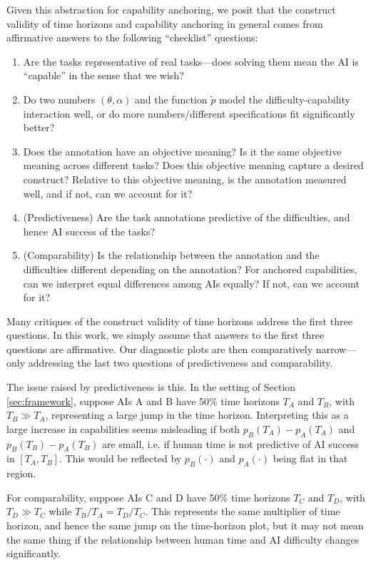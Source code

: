 \documentclass{article}
\theoremstyle{definition}
\begin{document}
Given this abstraction for capability anchoring, we posit that the construct validity of time horizons and capability anchoring in general comes from affirmative answers to the following ``checklist'' questions: 
\begin{enumerate}
    \item Are the tasks representative of real tasks---does solving them mean the AI is ``capable'' in the sense that we wish?
    \item Do two numbers $(\theta, \alpha)$ and the function $\tilde p$ model the difficulty-capability interaction well, or do more numbers/different specifications fit significantly better? 
    \item Does the annotation have an objective meaning? Is it the same objective meaning across different tasks? Does this objective meaning capture a desired construct? Relative to this objective meaning, is the annotation measured well, and if not, can we account for it?
    \item (Predictiveness) Are the task annotations predictive of the difficulties, and hence AI success of the tasks?
    \item (Comparability) Is the relationship between the annotation and the difficulties different depending on the annotation? For anchored capabilities, can we interpret equal differences among AIs equally? If not, can we account for it?
\end{enumerate}

Many critiques of the construct validity of time horizons address the first three questions. In this work, we simply assume that answers to the first three questions are affirmative. Our diagnostic plots are then comparatively narrow---only addressing the last two questions of predictiveness and comparability. 

The issue raised by predictiveness is this. In the setting of Section \ref{sec:framework}, suppose AIs A and B have 50\% time horizons $T_A$ and $T_B$, with $T_B \gg T_A$, representing a large jump in the time horizon. Interpreting this as a large increase in capabilities seems misleading if both $p_B(T_A)-p_A(T_A)$ and $p_B(T_B)-p_A(T_B)$ are small, i.e. if human time is not predictive of AI success in $[T_A, T_B]$. This would be reflected by $p_B(\cdot)$ and $p_A(\cdot)$ being flat in that region. 

For comparability, suppose AIs C and D have 50\% time horizons $T_C$ and $T_D$, with $T_D \gg T_C$ while $T_B/T_A = T_D/T_C$. This represents the same multiplier of time horizon, and hence the same jump on the time-horizon plot, but it may not mean the same thing if the relationship between human time and AI difficulty changes significantly. 
\end{document}
